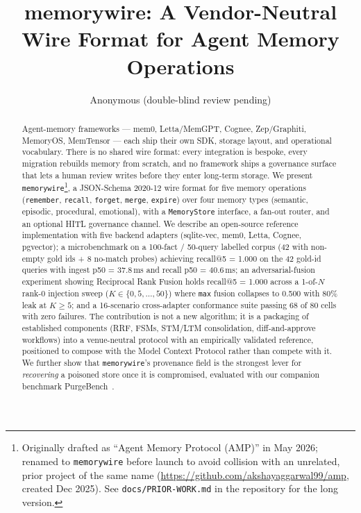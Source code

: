 \documentclass[11pt,letterpaper,twocolumn]{article}
\title{memorywire: A Vendor-Neutral Wire Format for Agent Memory Operations}
\author{Anonymous (double-blind review pending)}
\date{}
\begin{document}
\maketitle

\begin{abstract}
Agent-memory frameworks --- mem0, Letta/MemGPT, Cognee, Zep/Graphiti, MemoryOS, MemTensor --- each ship their own SDK, storage layout, and operational vocabulary. There is no shared wire format: every integration is bespoke, every migration rebuilds memory from scratch, and no framework ships a governance surface that lets a human review writes before they enter long-term storage. We present \texttt{memorywire}\footnote{Originally drafted as ``Agent Memory Protocol (AMP)'' in May 2026; renamed to \texttt{memorywire} before launch to avoid collision with an unrelated, prior project of the same name (\url{https://github.com/akshayaggarwal99/amp}, created Dec 2025). See \texttt{docs/PRIOR-WORK.md} in the repository for the long version.}, a JSON-Schema 2020-12 wire format for five memory operations (\texttt{remember}, \texttt{recall}, \texttt{forget}, \texttt{merge}, \texttt{expire}) over four memory types (semantic, episodic, procedural, emotional), with a \texttt{MemoryStore} interface, a fan-out router, and an optional HITL governance channel. We describe an open-source reference implementation with five backend adapters (sqlite-vec, mem0, Letta, Cognee, pgvector); a microbenchmark on a 100-fact / 50-query labelled corpus (42 with non-empty gold ids + 8 no-match probes) achieving recall@5 = 1.000 on the 42 gold-id queries with ingest p50 = 37.8\,ms and recall p50 = 40.6\,ms; an adversarial-fusion experiment showing Reciprocal Rank Fusion holds recall@5 = 1.000 across a 1-of-$N$ rank-0 injection sweep ($K \in \{0,5,\dots,50\}$) where \texttt{max} fusion collapses to 0.500 with 80\% leak at $K \geq 5$; and a 16-scenario cross-adapter conformance suite passing 68 of 80 cells with zero failures. The contribution is not a new algorithm; it is a packaging of established components (RRF, FSMs, STM/LTM consolidation, diff-and-approve workflows) into a venue-neutral protocol with an empirically validated reference, positioned to compose with the Model Context Protocol rather than compete with it. We further show that \texttt{memorywire}'s provenance field is the strongest lever for \emph{recovering} a poisoned store once it is compromised, evaluated with our companion benchmark PurgeBench~\cite{purgebench}.
\end{abstract}
\end{document}
